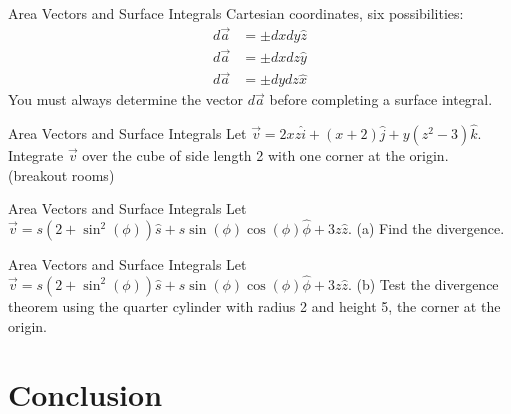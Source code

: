 \documentclass{beamer}
\begin{document}
\begin{frame}{Area Vectors and Surface Integrals}
Cartesian coordinates, six possibilities:
\begin{align}
d\vec{a} &= \pm dx dy \hat{z} \\
d\vec{a} &= \pm dx dz \hat{y} \\
d\vec{a} &= \pm dy dz \hat{x}
\end{align}
You must always determine the vector $d\vec{a}$ before completing a surface integral. 
\end{frame}

\begin{frame}{Area Vectors and Surface Integrals}
\small
Let $\vec{v} = 2xz \hat{i} + (x+2)\hat{j} + y(z^2-3)\hat{k}$.  Integrate $\vec{v}$ over the cube of side length 2 with one corner at the origin. (breakout rooms) \\ \vspace{6cm}
\end{frame}

\begin{frame}{Area Vectors and Surface Integrals}
\small
Let $\vec{v} = s(2+\sin^2(\phi))\hat{s} + s \sin(\phi)\cos(\phi)\hat{\phi} + 3 z \hat{z}$. (a) Find the divergence. \\ \vspace{6cm}
\end{frame}

\begin{frame}{Area Vectors and Surface Integrals}
\small
Let $\vec{v} = s(2+\sin^2(\phi))\hat{s} + s \sin(\phi)\cos(\phi)\hat{\phi} + 3 z \hat{z}$. (b) Test the divergence theorem using the quarter cylinder with radius 2 and height 5, the corner at the origin. \\ \vspace{6cm}
\end{frame}

\section{Conclusion}
\end{document}
